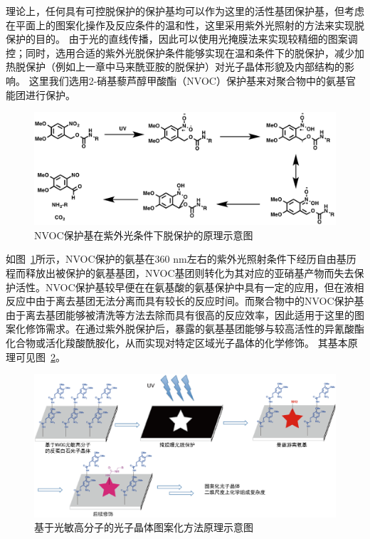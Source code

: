 理论上，任何具有可控脱保护的保护基均可以作为这里的活性基团保护基，但考虑在平面上的图案化操作及反应条件的温和性，这里采用紫外光照射的方法来实现脱保护的目的。
由于光的直线传播，因此可以使用光掩膜法来实现较精细的图案调控；同时，选用合适的紫外光脱保护条件能够实现在温和条件下的脱保护，减少加热脱保护（例如上一章中马来酰亚胺的脱保护）对光子晶体形貌及内部结构的影响。
这里我们选用2-硝基藜芦醇甲酸酯（NVOC）保护基来对聚合物中的氨基官能团进行保护\cite{Patchornik1970Photosensitive,Braun2003Novel}。
\begin{figure}[htbp]
  \centering
  \includegraphics[width=\linewidth]{figures/ch4/NVOC-principle.png}
  \caption{NVOC保护基在紫外光条件下脱保护的原理示意图}
  \label{fig:NVOC-UV-principle}
\end{figure}

如图~\ref{fig:NVOC-UV-principle}所示，NVOC保护的氨基在360 nm左右的紫外光照射条件下经历自由基历程而释放出被保护的氨基基团，NVOC基团则转化为其对应的亚硝基产物而失去保护活性。NVOC保护基较早便在在氨基酸的氨基保护中具有一定的应用\cite{Barltrop1965883}，但在液相反应中由于离去基团无法分离而具有较长的反应时间。而聚合物中的NVOC保护基由于离去基团能够被清洗等方法去除而具有很高的反应效率\cite{Cameron1991Photogeneration,Cui2012Phototunable}，因此适用于这里的图案化修饰需求。在通过紫外脱保护后，暴露的氨基基团能够与较高活性的异氰酸酯化合物或活化羧酸酰胺化，从而实现对特定区域光子晶体的化学修饰。
其基本原理可见图~\ref{fig:photolabile-pattern-principle}。

\begin{figure}[htbp]
  \centering
  \includegraphics[width=\linewidth]{figures/ch4/scheme-2D-pattern.png}
  \caption{基于光敏高分子的光子晶体图案化方法原理示意图}
  \label{fig:photolabile-pattern-principle}
\end{figure}


